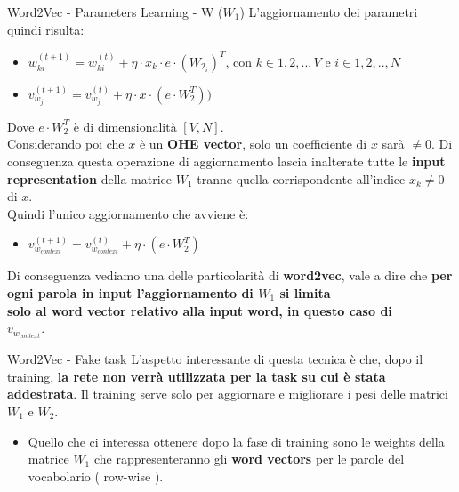 \documentclass[british]{beamer}
\begin{document}
\begin{frame}{Word2Vec - Parameters Learning - W (\(W_1\))}
	L'aggiornamento dei parametri quindi risulta:
	\begin{itemize}
		\item \( w_{ki}^{(t+1)} = w_{ki}^{(t)} + \eta\cdot x_k \cdot e \cdot (W_{2_{i}})^T\), con \(k \in {1,2,..,V}\) e \(i \in {1,2,..,N}\)
		\item \( v_{w_{j}}^{(t+1)} = v_{w_{j}}^{(t)} + \eta\cdot x \cdot \left( e \cdot W_{2}^T \right) )\)
	\end{itemize}
	Dove \(e \cdot W_2^T\) \`{e} di dimensionalit\`{a} \([V,N]\).\\
	Considerando poi che \(x\) \`{e} un \textbf{OHE vector}, solo un coefficiente di \(x\) sar\`{a} \(\neq 0\).
	Di conseguenza questa operazione di aggiornamento lascia inalterate tutte le \textbf{input representation} della matrice \textbf{\(W_1\)} tranne quella corrispondente all'indice \(x_k \neq0\) di \(x\). \\
	Quindi l'unico aggiornamento che avviene \`{e}:
	\begin{itemize}
		\item \( v_{w_{context}}^{(t+1)} = v_{w_{context}}^{(t)} + \eta\cdot \left(e \cdot W_{2}^T\right)\)
	\end{itemize}
	Di conseguenza vediamo una delle particolarit\`{a} di \textbf{word2vec}, vale a dire che \textbf{per ogni parola in input l'aggiornamento di \(W_1\) si limita \\solo al word vector relativo alla input word, in questo caso di\\ \(v_{w_{context}}\)}. 
\end{frame}

\begin{frame}{Word2Vec - Fake task}
	L'aspetto interessante di questa tecnica \`{e} che, dopo il training, \textbf{la rete non verr\`{a} utilizzata per la task su cui \`{e} stata addestrata}. Il training serve solo per aggiornare e migliorare i pesi delle matrici \(W_1\) e \(W_2\).
	\begin{itemize}
		\item Quello che ci interessa ottenere dopo la fase di training sono le weights della matrice \(W_1\) che rappresenteranno gli \textbf{word vectors} per le parole del vocabolario ( row-wise ).
	\end{itemize}
\end{frame}
\end{document}
